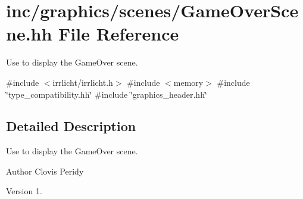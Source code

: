 \hypertarget{GameOverScene_8hh}{}\section{inc/graphics/scenes/\+Game\+Over\+Scene.hh File Reference}
\label{GameOverScene_8hh}


Use to display the Game\+Over scene.  


{\ttfamily \#include $<$irrlicht/irrlicht.\+h$>$}\newline
{\ttfamily \#include $<$memory$>$}\newline
{\ttfamily \#include \char`\"{}type\+\_\+compatibility.\+hh\char`\"{}}\newline
{\ttfamily \#include \char`\"{}graphics\+\_\+header.\+hh\char`\"{}}\newline


\subsection{Detailed Description}
Use to display the Game\+Over scene. 

\begin{DoxyAuthor}{Author}
Clovis Peridy 
\end{DoxyAuthor}
\begin{DoxyVersion}{Version}
1. 
\end{DoxyVersion}

